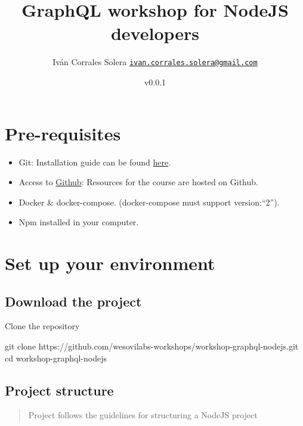 \documentclass[]{book}
\title{GraphQL workshop for NodeJS developers}
\author{Iván Corrales Solera
\href{mailto:ivan.corrales.solera@gmail.com}{\nolinkurl{ivan.corrales.solera@gmail.com}}}
\date{v0.0.1}
\newenvironment{Shaded}{\begin{snugshade}}{\end{snugshade}}
\newcommand{\FunctionTok}[1]{\textcolor[rgb]{0.00,0.00,0.00}{#1}}
\newcommand{\BuiltInTok}[1]{#1}
\newcommand{\NormalTok}[1]{#1}
\begin{document}
\maketitle

{
\setcounter{tocdepth}{1}
\tableofcontents
}
\chapter{Pre-requisites}\label{pre-requisites}

\begin{itemize}
\item
  Git: Installation guide can be found
  \href{https://git-scm.com/book/en/v2/Getting-Started-Installing-Git}{here}.
\item
  Access to \href{https://www.github.com}{Github}: Resources for the
  course are hosted on Github.
\item
  Docker \& docker-compose. (docker-compose must support version:``2'').
\item
  Npm installed in your computer.
\end{itemize}

\chapter{Set up your environment}\label{set-up-your-environment}

\section{Download the project}\label{download-the-project}

Clone the repository

\begin{Shaded}
\begin{Highlighting}[]
\FunctionTok{git}\NormalTok{ clone https://github.com/wesovilabs-workshops/workshop-graphql-nodejs.git}
\BuiltInTok{cd}\NormalTok{ workshop-graphql-nodejs}
\end{Highlighting}
\end{Shaded}

\section{Project structure}\label{project-structure}

\begin{quote}
Project follows the guidelines for structuring a NodeJS project
\end{quote}
\end{document}
